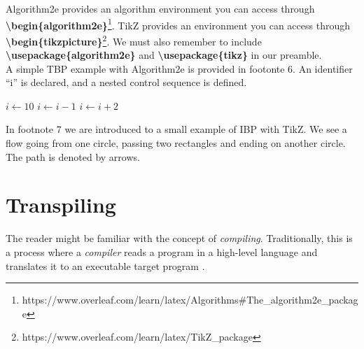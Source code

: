 Algorithm2e provides an algorithm environment you can access through \\ \textbf{\textbackslash begin\{algorithm2e\}}\footnote{https://www.overleaf.com/learn/latex/Algorithms\#The\_algorithm2e\_package}. TikZ provides an environment you can access through \textbf{\textbackslash begin\{tikzpicture\}}\footnote{https://www.overleaf.com/learn/latex/TikZ\_package}. We must also remember to include \\ \textbf{\textbackslash usepackage\{algorithm2e\}} and \textbf{\textbackslash usepackage\{tikz\}} in our preamble. \hfill \\

A simple TBP example with Algorithm2e is provided in footonte 6. An identifier ``i'' is declared, and a nested control sequence is defined.

\begin{algorithm}
$i\gets 10$\;
{
    $i\gets i-1$\;
}{
    {
        $i\gets i+2$\;
    }
}
\end{algorithm}

In footnote 7 we are introduced to a small example of IBP with TikZ. We see a flow going from one circle, passing two rectangles and ending on another circle. The path is denoted by arrows.


\section{Transpiling}

The reader might be familiar with the concept of \textit{compiling}. Traditionally, this is a process where a \textit{compiler} reads a program in a high-level language and translates it to an executable target program \cite{DBLP:books/aw/AhoSU86}. \hfill \\

